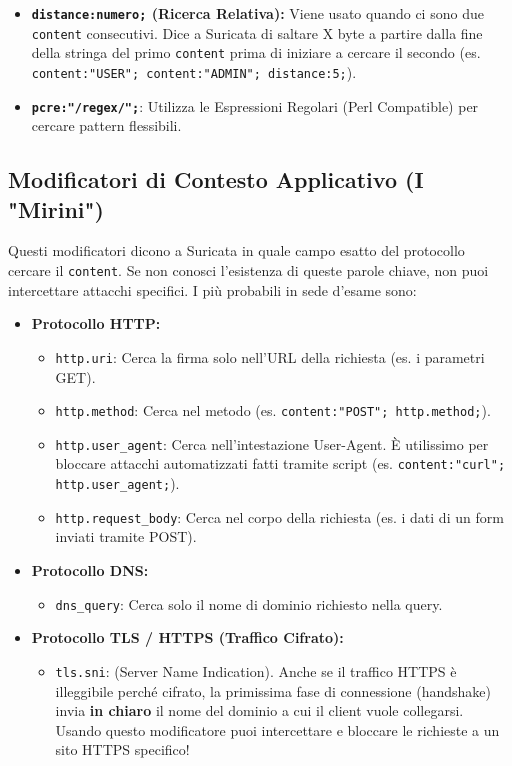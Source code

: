 \documentclass[12pt,a4paper]{report}
\begin{document}
\begin{itemize}
		\item \textbf{\texttt{distance:numero;} (Ricerca Relativa):} Viene usato quando ci sono due \texttt{content} consecutivi. Dice a Suricata di saltare X byte a partire dalla fine della stringa del primo \texttt{content} prima di iniziare a cercare il secondo (es. \texttt{content:"USER"; content:"ADMIN"; distance:5;}).
		\item \textbf{\texttt{pcre:"/regex/";}}: Utilizza le Espressioni Regolari (Perl Compatible) per cercare pattern flessibili.
	\end{itemize}
	
	\subsection{Modificatori di Contesto Applicativo (I "Mirini")}
	Questi modificatori dicono a Suricata in quale campo esatto del protocollo cercare il \texttt{content}. Se non conosci l'esistenza di queste parole chiave, non puoi intercettare attacchi specifici. I più probabili in sede d'esame sono:
	
	\begin{itemize}
		\item \textbf{Protocollo HTTP:}
		\begin{itemize}
			\item \texttt{http.uri}: Cerca la firma solo nell'URL della richiesta (es. i parametri GET).
			\item \texttt{http.method}: Cerca nel metodo (es. \texttt{content:"POST"; http.method;}).
			\item \texttt{http.user\_agent}: Cerca nell'intestazione User-Agent. È utilissimo per bloccare attacchi automatizzati fatti tramite script (es. \texttt{content:"curl"; http.user\_agent;}).
			\item \texttt{http.request\_body}: Cerca nel corpo della richiesta (es. i dati di un form inviati tramite POST).
		\end{itemize}
		\item \textbf{Protocollo DNS:}
		\begin{itemize}
			\item \texttt{dns\_query}: Cerca solo il nome di dominio richiesto nella query.
		\end{itemize}
		\item \textbf{Protocollo TLS / HTTPS (Traffico Cifrato):}
		\begin{itemize}
			\item \texttt{tls.sni}: (Server Name Indication). Anche se il traffico HTTPS è illeggibile perché cifrato, la primissima fase di connessione (handshake) invia \textbf{in chiaro} il nome del dominio a cui il client vuole collegarsi. Usando questo modificatore puoi intercettare e bloccare le richieste a un sito HTTPS specifico!
		\end{itemize}
	\end{itemize}
	
\end{document}
